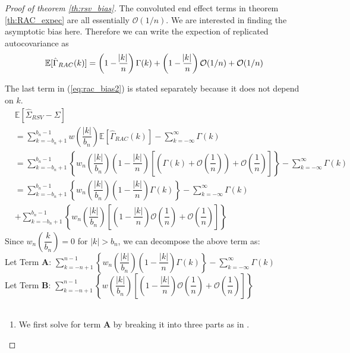 \documentclass[12pt]{article}
\begin{document}
\begin{proof}[Proof of theorem \ref{th:rsv_bias}]
The convoluted end effect terms in theorem \ref{th:RAC_expec} are all essentially $\mathcal{O}(1/n)$. We are interested in finding the asymptotic bias here. Therefore we can write the expection of replicated autocovariance as 
\begin{equation} \label{eq:rac_bias2}
\mathbb{E}[\hat{\Gamma}_{RAC}(k)] = \left(1 - \dfrac{\abs{k}}{n}\right)\Gamma(k) + \left(1 - \dfrac{\abs{k}}{n}\right)\mathcal{O}(1/n) + \mathcal{O}(1/n)    
\end{equation}

The last term in (\ref{eq:rac_bias2}) is stated separately because it does not depend on $k$. 
\begin{align*}
    &\mathbb{E}[\hat{\Sigma}_{RSV} - \Sigma]\\
    &= \sum_{k=-b_n+1}^{b_n-1} w\left(\dfrac{|k|}{b_n}\right)\mathbb{E}[\hat{\Gamma}_{RAC}(k)]-\sum_{k=-\infty}^{\infty}\Gamma(k)\\
    &= \sum_{k=-b_n+1}^{b_n-1}\left\{ w_n\left(\dfrac{|k|}{b_n}\right)\left(1-\dfrac{|k|}{n}\right)\left[\left(\Gamma(k) + \mathcal{O}\left(\dfrac{1}{n}\right)\right) + \mathcal{O}\left(\dfrac{1}{n}\right)\right]\right\} - \sum_{k=-\infty}^{\infty}\Gamma(k)\\
    &= \sum_{k=-b_n+1}^{b_n-1}\left\{ w_n\left(\dfrac{|k|}{b_n}\right)\left(1-\dfrac{|k|}{n}\right)\Gamma(k) \right\} - \sum_{k=-\infty}^{\infty}\Gamma(k)\\
    &+ \sum_{k=-b_n+1}^{b_n-1}\left\{ w_n\left(\dfrac{|k|}{b_n}\right)\left[\left(1-\dfrac{|k|}{n}\right)\mathcal{O}\left(\dfrac{1}{n}\right) + \mathcal{O}\left(\dfrac{1}{n}\right)\right] \right\}
\end{align*}
Since $w_n\left(\dfrac{k}{b_n}\right) = 0$ for $|k| > b_n$, we can decompose the above term as:\\
Let Term \textbf{A}: $\sum\limits_{k=-n+1}^{n-1}\left\{w_n\left(\dfrac{|k|}{b_n}\right)\left(1-\dfrac{|k|}{n}\right)\Gamma(k) \right\} - \sum\limits_{k=-\infty}^{\infty}\Gamma(k)$\\ 

Let Term \textbf{B}: $\sum\limits_{k=-n+1}^{n-1}\left\{w\left(\dfrac{|k|}{b_n}\right)\left[\left(1-\dfrac{|k|}{n}\right)\mathcal{O}\left(\dfrac{1}{n}\right) + \mathcal{O}\left(\dfrac{1}{n}\right)\right] \right\}$\\\\

\begin{enumerate}
    \item We first solve for term {\textbf{A}} by breaking it into three parts as in \cite{hannan2009multiple}.\\


\end{enumerate}
\end{proof}
\end{document}
